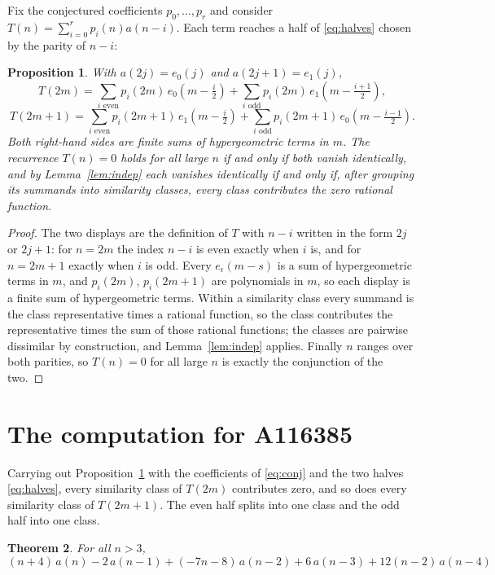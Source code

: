 \documentclass[11pt,a4paper]{article}
\theoremstyle{plain}
\newtheorem{theorem}{Theorem}
\newtheorem{proposition}[theorem]{Proposition}
\theoremstyle{definition}
\begin{document}
Fix the conjectured coefficients $p_{0},\dots,p_{r}$ and consider
$T(n)=\sum_{i=0}^{r}p_{i}(n)a(n-i)$. Each term reaches a half of \eqref{eq:halves} chosen
by the parity of $n-i$:

\begin{proposition}\label{prop:split}
With $a(2j)=e_{0}(j)$ and $a(2j+1)=e_{1}(j)$,
\[
T(2m)=\sum_{i \text{ even}}p_{i}(2m)\,e_{0}\!\left(m-\tfrac{i}{2}\right)
      +\sum_{i \text{ odd}}p_{i}(2m)\,e_{1}\!\left(m-\tfrac{i+1}{2}\right),
\]
\[
T(2m+1)=\sum_{i \text{ even}}p_{i}(2m+1)\,e_{1}\!\left(m-\tfrac{i}{2}\right)
      +\sum_{i \text{ odd}}p_{i}(2m+1)\,e_{0}\!\left(m-\tfrac{i-1}{2}\right).
\]
Both right-hand sides are finite sums of hypergeometric terms in $m$. The recurrence
$T(n)=0$ holds for all large $n$ if and only if both vanish identically, and by
Lemma~\ref{lem:indep} each vanishes identically if and only if, after grouping its
summands into similarity classes, every class contributes the zero rational function.
\end{proposition}

\begin{proof}
The two displays are the definition of $T$ with $n-i$ written in the form $2j$ or $2j+1$:
for $n=2m$ the index $n-i$ is even exactly when $i$ is, and for $n=2m+1$ exactly when $i$
is odd. Every $e_{\epsilon}(m-s)$ is a sum of hypergeometric terms in $m$, and
$p_{i}(2m)$, $p_{i}(2m+1)$ are polynomials in $m$, so each display is a finite sum of
hypergeometric terms. Within a similarity class every summand is the class representative
times a rational function, so the class contributes the representative times the sum of
those rational functions; the classes are pairwise dissimilar by construction, and
Lemma~\ref{lem:indep} applies. Finally $n$ ranges over both parities, so $T(n)=0$ for all
large $n$ is exactly the conjunction of the two.
\end{proof}

\section{The computation for A116385}

Carrying out Proposition~\ref{prop:split} with the coefficients of \eqref{eq:conj} and the
two halves \eqref{eq:halves}, every similarity class of $T(2m)$ contributes zero, and so
does every similarity class of $T(2m+1)$. The even half splits into one class
and the odd half into one class.

\begin{theorem}
For all $n> 3$,
\[
(n + 4)\,a(n) - 2\,a(n-1) + (- 7 n - 8)\,a(n-2) + 6\,a(n-3) + 12 \left(n - 2\right)\,a(n-4)
\]
\end{theorem}
\end{document}

